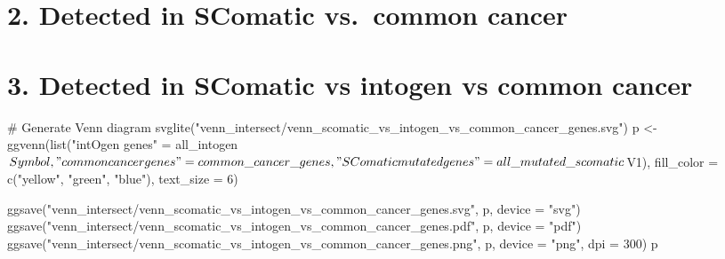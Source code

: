 \documentclass[
  letterpaper,
  DIV=11,
  numbers=noendperiod]{scrreprt}
\newenvironment{Shaded}{\begin{snugshade}}{\end{snugshade}}
\newcommand{\NormalTok}[1]{\textcolor[rgb]{0.00,0.23,0.31}{#1}}
\begin{document}
\section{2. Detected in SComatic vs.~common
cancer}\label{detected-in-scomatic-vs.-common-cancer}

\begin{Shaded}
\end{Shaded}

\section{3. Detected in SComatic vs intogen vs common
cancer}\label{detected-in-scomatic-vs-intogen-vs-common-cancer}

\begin{Shaded}
\begin{Highlighting}[]
\NormalTok{\# Generate Venn diagram}
\NormalTok{svglite("venn\_intersect/venn\_scomatic\_vs\_intogen\_vs\_common\_cancer\_genes.svg")}
\NormalTok{p \textless{}{-} ggvenn(list("intOgen genes" = all\_intogen$Symbol, "common cancer genes" = common\_cancer\_genes, "SComatic mutated genes" = all\_mutated\_scomatic$V1), fill\_color = c("yellow", "green", "blue"), text\_size = 6)}

\NormalTok{ggsave("venn\_intersect/venn\_scomatic\_vs\_intogen\_vs\_common\_cancer\_genes.svg", p,  device = "svg")}
\NormalTok{ggsave("venn\_intersect/venn\_scomatic\_vs\_intogen\_vs\_common\_cancer\_genes.pdf", p,  device = "pdf")}
\NormalTok{ggsave("venn\_intersect/venn\_scomatic\_vs\_intogen\_vs\_common\_cancer\_genes.png", p,  device = "png", dpi = 300)}
\NormalTok{p}
\end{Highlighting}
\end{Shaded}
\end{document}
